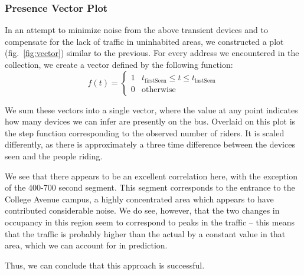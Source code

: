 \subsubsection*{Presence Vector Plot}

In an attempt to minimize noise from the above transient devices and to compensate for the lack of traffic in uninhabited areas, we constructed a plot (fig.~\ref{fig:vector}) similar to the previous. 
For every address we encountered in the collection, we create a vector defined by the following function:
\begin{equation*}
  f(t) = \begin{cases}
    1 & t_{\text{firstSeen}} \le t \le t_{\text{lastSeen}}\\
    0 & \text{otherwise}
  \end{cases}
\end{equation*}

We sum these vectors into a single vector, where the value at any point indicates how many devices we can infer are presently on the bus.
Overlaid on this plot is the step function corresponding to the observed number of riders.
It is scaled differently, as there is approximately a three time difference between the devices seen and the people riding.

We see that there appears to be an excellent correlation here, with the exception of the 400-700 second segment. %
This segment corresponds to the entrance to the College Avenue campus, a highly concentrated area which appears to have contributed considerable noise.
We do see, however, that the two changes in occupancy in this region seem to correspond to peaks in the traffic -- this means that the traffic is probably higher than the actual by a constant value in that area, which we can account for in prediction.
		
Thus, we can conclude that this approach is successful. %

